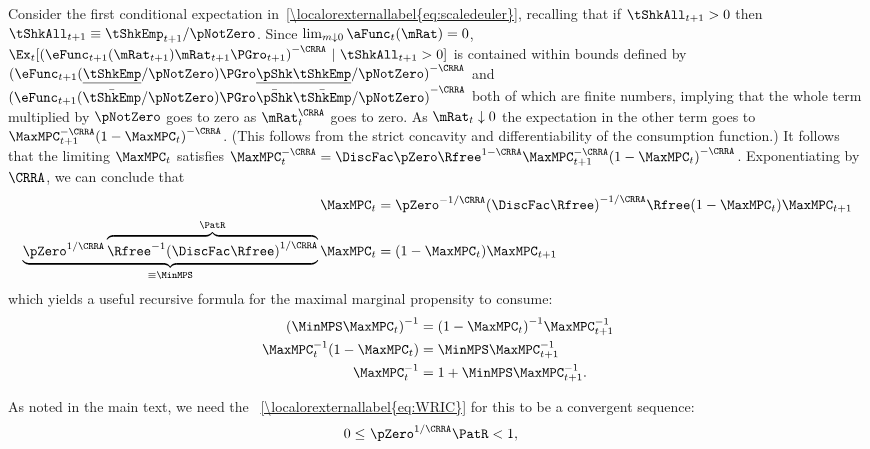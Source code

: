 \documentclass[\econtexRoot/BufferStockTheory]{subfiles}
\begin{document}
Consider the first conditional expectation in~\eqref{\localorexternallabel{eq:scaledeuler}},
recalling that if $\tShkAll_{t+1}>0$ then $\tShkAll_{t+1} \equiv
\tShkEmp_{t+1}/\pNotZero$.  Since $\lim_{m \downarrow 0}
\aFunc_{t}(\mRat) = 0$,
$\Ex_{t}[{(\eFunc_{t+1}(\mRat_{t+1})\mRat_{t+1}\PGro_{t+1})}^{-\CRRA}~|~\tShkAll_{t+1}>0]$
is contained within bounds defined by
${(\eFunc_{t+1}(\underline{\tShkEmp}/\pNotZero) \PGro\underline{\pShk}
\underline{\tShkEmp}/\pNotZero)}^{-\CRRA}$ and
${(\eFunc_{t+1}(\bar{\tShkEmp}/\pNotZero) \PGro\bar{\pShk}
\bar{\tShkEmp}/\pNotZero)}^{-\CRRA}$ both of which are finite numbers,
implying that the whole term multiplied by $\pNotZero$ goes to zero as
$\mRat_{t}^{\CRRA}$ goes to zero.  As $\mRat_{t} \downarrow 0$ the
expectation in the other term goes to $\MaxMPC _{t+1}^{-\CRRA
}{(1-\MaxMPC _{t})}^{-\CRRA }$. (This follows from the strict concavity
and differentiability of the consumption function.) It follows that
the limiting $\MaxMPC_{t}$ satisfies $\MaxMPC_{t}^{-\CRRA }=\DiscFac
\pZero\Rfree^{1-\CRRA }\MaxMPC_{t+1}^{-\CRRA }{(1-\MaxMPC
_{t})}^{-\CRRA }$. Exponentiating by $\CRRA$, we can conclude that
\begin{equation}\begin{gathered}\begin{aligned}
\MaxMPC_{t} & = \pZero^{-1/\CRRA} {(\DiscFac
\Rfree)}^{-1/\CRRA}\Rfree(1-\MaxMPC _{t})\MaxMPC _{t+1} \notag
\\ \underbrace{\pZero^{1/\CRRA}\overbrace{{\Rfree}^{-1}{(\DiscFac
    \Rfree)}^{1/\CRRA}}^{\PatR}}_{\equiv \MinMPS}
\MaxMPC_{t} & = (1-\MaxMPC _{t})\MaxMPC _{t+1} \label{eq:MinMPSDef}
\end{aligned}\end{gathered}\end{equation}
which yields a useful recursive formula for the maximal marginal propensity to consume:
\begin{equation}\begin{gathered}\begin{aligned}
  {(\MinMPS \MaxMPC_{t})}^{-1}  & = {(1-\MaxMPC_{t})}^{-1}\MaxMPC_{t+1}^{-1}  \notag
\\ \MaxMPC_{t}^{-1}(1-\MaxMPC_{t})  & = \MinMPS \MaxMPC_{t+1}^{-1}   \notag
\\ \MaxMPC_{t}^{-1}  & = 1+\MinMPS \MaxMPC_{t+1}^{-1} \label{eq:MaxMPCInvApndx}.
\end{aligned}\end{gathered}\end{equation}

As noted in the main text, we need the \WRIC~\eqref{\localorexternallabel{eq:WRIC}} for this to be a convergent sequence:
\begin{equation}\begin{gathered}\begin{aligned}
  0 \leq & ~\pZero^{1/\CRRA} \PatR < 1 \label{eq:WRICapndx},
\end{aligned}\end{gathered}\end{equation}
\end{document}
